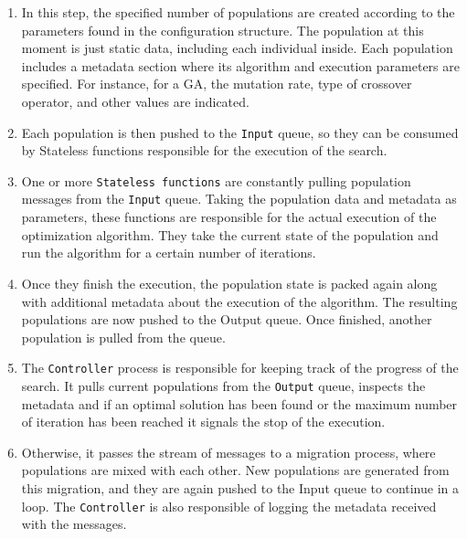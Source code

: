 \documentclass[review]{elsarticle}
\begin{document}
\begin{enumerate}
\item In this step, the specified number of populations are created according to the 
parameters found in the configuration structure. The population at this moment is just
static data, including each individual inside. Each population includes a metadata
section where its algorithm and execution parameters are specified. For instance, 
for a GA, the mutation rate, type of crossover operator, and other values are indicated.

\item Each population is then pushed to the \texttt{Input} queue, so they can be consumed 
by Stateless functions responsible for the execution of the search.

\item One or more \texttt{Stateless functions} are constantly pulling population messages
from the \texttt{Input} queue. Taking the population data and metadata as parameters, these 
functions are responsible for the actual execution of the optimization algorithm. 
They take the current state of the population and run the algorithm for a certain 
number of iterations. 

\item Once they finish the execution, the population state
is packed again along with additional metadata about the execution of the algorithm.
The resulting populations are now pushed to the Output queue. Once finished, another 
population is pulled from the queue.

\item The \texttt{Controller} process is responsible for keeping track of the progress of 
the search. It pulls current populations from the \texttt{Output} queue, inspects the metadata 
and if an optimal solution has been found or the maximum number of iteration has been
reached it signals the stop of the execution. 

\item Otherwise, it passes the stream of messages 
to a migration process, where populations are mixed with each other. New populations 
are generated from this migration, and they are again pushed to the Input queue to continue 
in a loop. The \texttt{Controller} is also responsible of logging the metadata received with the
messages.  
\end{enumerate}
\end{document}
